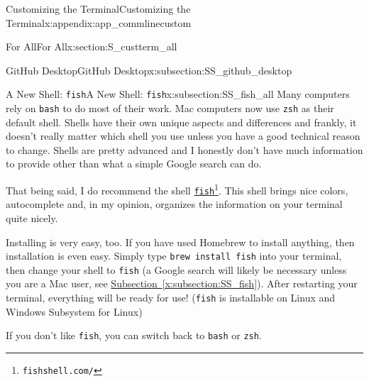 \documentclass[oneside,10pt,]{book}
\newcommand{\xreffont}{\relax}
\newcommand{\mono}[1]{\texttt{#1}}
\begin{document}
\begin{appendixptx}{Customizing the Terminal}{}{Customizing the Terminal}{}{}{x:appendix:app_commlinecustom}
\begin{sectionptx}{For All}{}{For All}{}{}{x:section:S_custterm_all}
\begin{subsectionptx}{GitHub Desktop}{}{GitHub Desktop}{}{}{x:subsection:SS_github_desktop}
\end{subsectionptx}
%
%
\typeout{************************************************}
\typeout{Subsection A.4.3 A New Shell: \mono{fish}}
\typeout{************************************************}
%
\begin{subsectionptx}{A New Shell: \mono{fish}}{}{A New Shell: \mono{fish}}{}{}{x:subsection:SS_fish_all}
%
%
Many computers rely on \mono{bash} to do most of their work. Mac computers now use \mono{zsh} as their default shell. Shells have their own unique aspects and differences and frankly, it doesn't really matter which shell you use unless you have a good technical reason to change. Shells are pretty advanced and I honestly don't have much information to provide other than what a simple Google search can do.%
\par
That being said, I do recommend the shell \href{https://fishshell.com/}{\mono{fish}}\footnote{\nolinkurl{fishshell.com/}\label{g:fn:idm479217000}}. This shell brings nice colors, autocomplete and, in my opinion, organizes the information on your terminal quite nicely.%
\par
Installing is very easy, too. If you have used Homebrew to install anything, then installation is even easy. Simply type \mono{brew install fish} into your terminal, then change your shell to \mono{fish} (a Google search will likely be necessary unless you are a Mac user, see \hyperref[x:subsection:SS_fish]{Subsection~{\xreffont\ref{x:subsection:SS_fish}}}). After restarting your terminal, everything will be ready for use! (\mono{fish} is installable on Linux and Windows Subsystem for Linux)%
\par
If you don't like \mono{fish}, you can switch back to \mono{bash} or \mono{zsh}.%
\end{subsectionptx}
\end{sectionptx}
\end{appendixptx}
%
%
\typeout{************************************************}
\typeout{************************************************}
%
\end{document}
